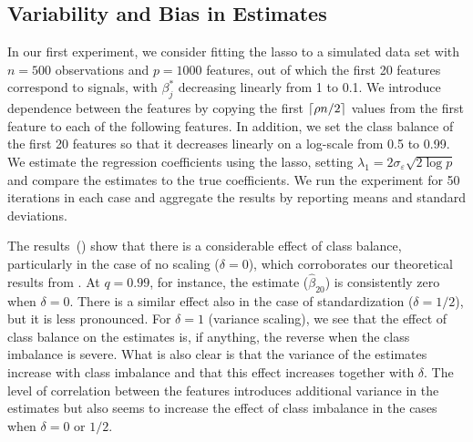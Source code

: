 \subsection{Variability and Bias in Estimates}\label{sec:experiments-varbias}

In our first experiment, we consider fitting the lasso to a simulated data set with \(n=500\) observations and \(p = \num{1000}\) features, out of which the first 20 features correspond to signals, with \(\beta_j^*\) decreasing linearly from 1 to 0.1.
We introduce dependence between the features by copying the first \(\lceil \rho n/2 \rceil\) values from the first feature to each of the following features.
In addition, we set the class balance of the first 20 features so that it decreases linearly on a log-scale from 0.5 to 0.99.
We estimate the regression coefficients using the lasso, setting \(\lambda_1 = 2 \sigma_\varepsilon \sqrt{2 \log p }\) and compare the estimates to the true coefficients. We run the experiment for 50 iterations in each case and aggregate the results by reporting means and standard deviations.

The results~() show that there is a considerable effect of class balance, particularly in the case of no scaling (\(\delta = 0\)), which corroborates our theoretical results from . At \(q=0.99\), for instance, the estimate (\(\hat{\beta}_{20}\)) is consistently zero when \(\delta = 0\). There is a similar effect also in the case of standardization (\(\delta = 1/2\)), but it is less pronounced. For \(\delta=1\) (variance scaling), we see that the effect of class balance on the estimates is, if anything, the reverse when the class imbalance is severe. What is also clear is that the variance of the estimates increase with class imbalance and that this effect increases together with \(\delta\). The level of correlation between the features introduces additional variance in the estimates but also seems to increase the effect of class imbalance in the cases when \(\delta = 0\) or \(1/2\).

